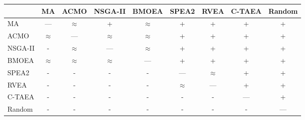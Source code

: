 \begin{tabular}{@{}lcccccccc@{}}
\toprule
 & MA & ACMO & NSGA-II & BMOEA & SPEA2 & RVEA & C-TAEA & Random \\
\midrule
MA & --- & $\approx$ & + & $\approx$ & + & + & + & + \\
ACMO & $\approx$ & --- & $\approx$ & $\approx$ & + & + & + & + \\
NSGA-II & - & $\approx$ & --- & $\approx$ & + & + & + & + \\
BMOEA & $\approx$ & $\approx$ & $\approx$ & --- & + & + & + & + \\
SPEA2 & - & - & - & - & --- & $\approx$ & + & + \\
RVEA & - & - & - & - & $\approx$ & --- & + & + \\
C-TAEA & - & - & - & - & - & - & --- & + \\
Random & - & - & - & - & - & - & - & --- \\
\bottomrule
\end{tabular}